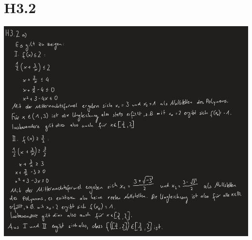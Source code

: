 \documentclass{article}
\begin{document}
\section{H3.2}
\bigskip
\includegraphics[scale=0.5]{h3_2a} 
\end{document}
